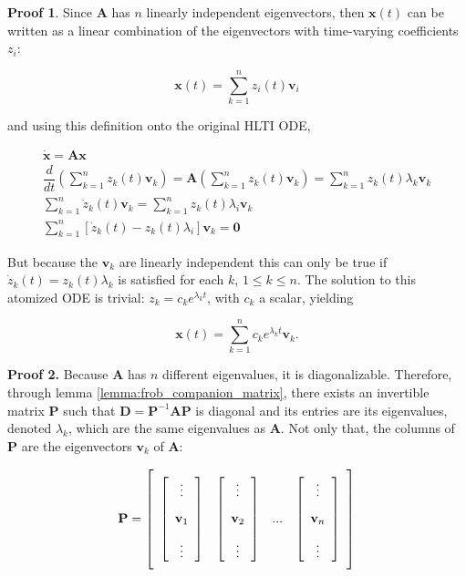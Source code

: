 \textbf{Proof 1}. Since $\mathbf{A}$ has $n$ linearly independent eigenvectors, then $\mathbf{x}(t)$ can be written as a linear combination of the eigenvectors with time-varying coefficients $z_i$:

\begin{equation} \mathbf{x}(t) = \sum_{k=1}^n z_i(t)\mathbf{v}_i \end{equation}

	and using this definition onto the original HLTI ODE,

\begin{gather}
	\dot{\mathbf{x}} = \mathbf{Ax} \nonumber\\[5mm]
	\dfrac{d}{dt}\left( \sum_{k=1}^n z_k(t)\mathbf{v}_k\right) = \mathbf{A}\left( \sum_{k=1}^n z_k(t)\mathbf{v}_k\right) =  \sum_{k=1}^n z_k(t)\lambda_k\mathbf{v}_k \nonumber\\[5mm]
	\sum_{k=1}^n \dot{z}_k(t) \mathbf{v}_k =  \sum_{k=1}^n z_k(t)\lambda_i\mathbf{v}_k \nonumber\\[5mm]
	\sum_{k=1}^n \left[ \dot{z}_k(t) -z_k(t)\lambda_i\right] \mathbf{v}_k = \mathbf{0}
\end{gather}

	But because the $\mathbf{v}_k$ are linearly independent this can only be true if $\dot{z}_k(t) =  z_k(t)\lambda_k$ is satisfied for each $k$, $1\leq k \leq n$. The solution to this atomized ODE is trivial: $z_k = c_ke^{\lambda_k t}$, with $c_k$ a scalar, yielding

\begin{equation} \mathbf{x}(t) = \sum_{k=1}^n c_ke^{\lambda_k t} \mathbf{v}_k . \end{equation}

\textbf{Proof 2.} Because $\mathbf{A}$ has $n$ different eigenvalues, it is diagonalizable. Therefore, through lemma \ref{lemma:frob_companion_matrix}, there exists an invertible matrix $\mathbf{P}$ such that $\mathbf{D} = \mathbf{P}^{-1}\mathbf{A}\mathbf{P}$ is diagonal and its entries are its eigenvalues, denoted $\lambda_k$, which are the same eigenvalues as $\mathbf{A}$. Not only that, the columns of $\mathbf{P}$ are the eigenvectors $\mathbf{v}_k$ of $\mathbf{A}$:

\begin{equation} \mathbf{P} = \left[\raisebox{15mm}{} \begin{array}{cccc} \left[\begin{array}{c} \vdots \\[3mm] \mathbf{v}_1 \\[3mm] \vdots \end{array}\right] & \left[\begin{array}{c} \vdots \\[3mm] \mathbf{v}_2 \\[3mm] \vdots \end{array}\right] & ... & \left[\begin{array}{c} \vdots \\[3mm] \mathbf{v}_n \\[3mm] \vdots \end{array}\right] \end{array}\right]
\end{equation}

